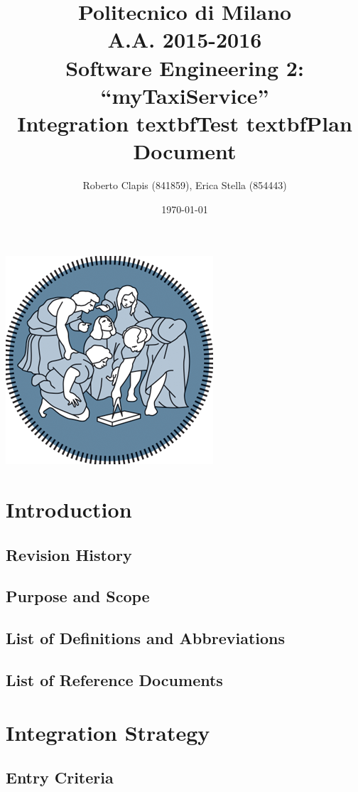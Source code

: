 \documentclass{article}
\author{Roberto Clapis (841859), Erica Stella (854443)}
\date{\today}
\title{Politecnico di Milano
	\\A.A. 2015\@-\@2016
	\\Software Engineering 2: ``myTaxiService''
	\\\textbf{I}ntegration textbf{T}est textbf{P}lan \textbf{D}ocument}
\begin{document}
\maketitle
\begin{center}
	\includegraphics{polimi-logo}
\end{center}
\clearpage
\tableofcontents
\clearpage
\section{Introduction}
\subsection{Revision History}
\subsection{Purpose and Scope}
\subsection{List of Definitions and Abbreviations}
\subsection{List of Reference Documents}
\section{Integration Strategy}
\subsection{Entry Criteria}
\end{document}
